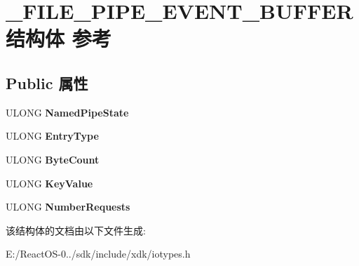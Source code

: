 \hypertarget{struct___f_i_l_e___p_i_p_e___e_v_e_n_t___b_u_f_f_e_r}{}\section{\+\_\+\+F\+I\+L\+E\+\_\+\+P\+I\+P\+E\+\_\+\+E\+V\+E\+N\+T\+\_\+\+B\+U\+F\+F\+E\+R结构体 参考}
\label{struct___f_i_l_e___p_i_p_e___e_v_e_n_t___b_u_f_f_e_r}
\subsection*{Public 属性}
\begin{DoxyCompactItemize}
\item 
\mbox{\label{struct___f_i_l_e___p_i_p_e___e_v_e_n_t___b_u_f_f_e_r_ab88ad162be378f0a6271fe4954bea227}} 
U\+L\+O\+NG {\bfseries Named\+Pipe\+State}
\item 
\mbox{\label{struct___f_i_l_e___p_i_p_e___e_v_e_n_t___b_u_f_f_e_r_acfbd25ffaafb98fe3ed17e553a93f53d}} 
U\+L\+O\+NG {\bfseries Entry\+Type}
\item 
\mbox{\label{struct___f_i_l_e___p_i_p_e___e_v_e_n_t___b_u_f_f_e_r_a19bc80712164c9a8120103297ce434b3}} 
U\+L\+O\+NG {\bfseries Byte\+Count}
\item 
\mbox{\label{struct___f_i_l_e___p_i_p_e___e_v_e_n_t___b_u_f_f_e_r_af972a45379af359fba295cff0ba17fa0}} 
U\+L\+O\+NG {\bfseries Key\+Value}
\item 
\mbox{\label{struct___f_i_l_e___p_i_p_e___e_v_e_n_t___b_u_f_f_e_r_a5cd14345dfa76f0ea77d9381e48cf2dc}} 
U\+L\+O\+NG {\bfseries Number\+Requests}
\end{DoxyCompactItemize}


该结构体的文档由以下文件生成\+:\begin{DoxyCompactItemize}
\item 
E\+:/\+React\+O\+S-\/0../sdk/include/xdk/iotypes.\+h\end{DoxyCompactItemize}

